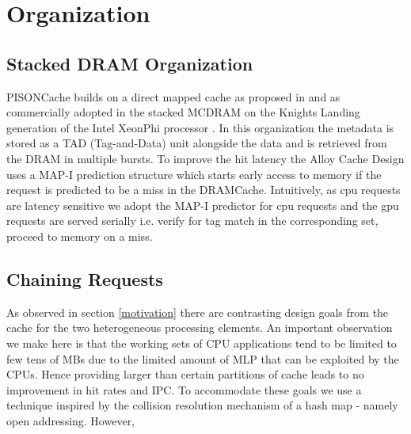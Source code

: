 \section{\cachename Organization} \label{mechanism}
\subsection{Stacked DRAM Organization} \label{rbhvblp}
PISONCache builds on a direct mapped cache as proposed in \cite{alloy} and as commercially adopted in the stacked MCDRAM on the Knights Landing generation of the Intel XeonPhi processor \cite{xeonphi}. In this organization the metadata is stored as a TAD (Tag-and-Data) unit alongside the data and is retrieved from the DRAM in multiple bursts. To improve the hit latency the Alloy Cache Design uses a MAP-I prediction structure which starts early access to memory if the request is predicted to be a miss in the DRAMCache. Intuitively, as cpu requests are latency sensitive we adopt the MAP-I predictor for cpu requests and the gpu requests are served serially i.e. verify for tag match in the corresponding set, proceed to memory on a miss.
\subsection{Chaining Requests}
As observed in section \ref{motivation} there are contrasting design goals from the cache for the two heterogeneous processing elements. An important observation we make here is that the working sets of CPU applications tend to be limited to few tens of MBs due to the limited amount of MLP that can be exploited by the CPUs. Hence providing larger than certain partitions of cache leads to no improvement in hit rates and IPC. To accommodate these goals we use a technique inspired by the collision resolution mechanism of a hash map - namely open addressing. However, 